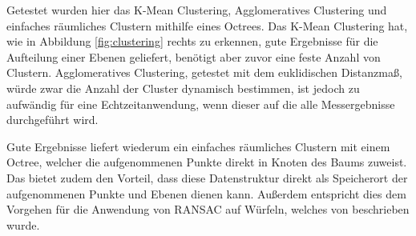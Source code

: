 Getestet wurden hier das K-Mean Clustering, Agglomeratives Clustering und einfaches räumliches Clustern mithilfe eines Octrees. Das K-Mean Clustering hat, wie in Abbildung \ref{fig:clustering} rechts zu erkennen, gute Ergebnisse für die Aufteilung einer Ebenen geliefert, benötigt aber zuvor eine feste Anzahl von Clustern. Agglomeratives Clustering, getestet mit dem euklidischen Distanzmaß, würde zwar die Anzahl der Cluster dynamisch bestimmen, ist jedoch zu aufwändig für eine Echtzeitanwendung, wenn dieser auf die alle Messergebnisse durchgeführt wird. 

Gute Ergebnisse liefert wiederum ein einfaches räumliches Clustern mit einem Octree, welcher die aufgenommenen Punkte direkt in Knoten des Baums zuweist. Das bietet zudem den Vorteil, dass diese Datenstruktur direkt als Speicherort der aufgenommenen Punkte und Ebenen dienen kann. Außerdem entspricht dies dem Vorgehen für die Anwendung von RANSAC auf Würfeln, welches von \citet{yang2010plane} beschrieben wurde. 
